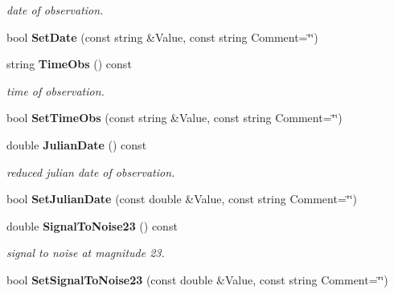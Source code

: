 \begin{CompactItemize}
\begin{CompactList}\small\item\em date of observation.\item\end{CompactList}\item 
{}
bool {\bf Set\-Date} (const string \&Value, const string Comment=\char`\"{}\char`\"{})\label{class_reducedimage_a84}

\item 
{}
string {\bf Time\-Obs} () const\label{class_reducedimage_a85}

\begin{CompactList}\small\item\em time of observation.\item\end{CompactList}\item 
{}
bool {\bf Set\-Time\-Obs} (const string \&Value, const string Comment=\char`\"{}\char`\"{})\label{class_reducedimage_a86}

\item 
{}
double {\bf Julian\-Date} () const\label{class_reducedimage_a87}

\begin{CompactList}\small\item\em reduced julian date of observation.\item\end{CompactList}\item 
{}
bool {\bf Set\-Julian\-Date} (const double \&Value, const string Comment=\char`\"{}\char`\"{})\label{class_reducedimage_a88}

\item 
{}
double {\bf Signal\-To\-Noise23} () const\label{class_reducedimage_a89}

\begin{CompactList}\small\item\em signal to noise at magnitude 23.\item\end{CompactList}\item 
{}
bool {\bf Set\-Signal\-To\-Noise23} (const double \&Value, const string Comment=\char`\"{}\char`\"{})\label{class_reducedimage_a90}


\end{CompactItemize}
